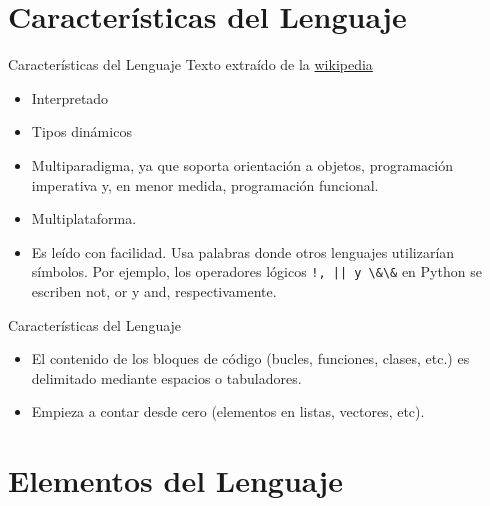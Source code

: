 \documentclass[hyperref={colorlinks=true}]{beamer}
\begin{document}
\section{Características del Lenguaje}
\begin{frame}{Características del Lenguaje}
\onslide<+->Texto extraído de la \href{http://es.wikipedia.org/wiki/Python\#Elementos_del_lenguaje}{wikipedia}
\begin{itemize}
\item<+-> Interpretado
\item<+-> Tipos dinámicos
\item<+->  Multiparadigma, ya que soporta orientación a objetos, programación imperativa y, en menor medida, programación funcional.
\item<+-> Multiplataforma.

\item<+-> Es leído con facilidad. Usa  palabras donde otros lenguajes utilizarían símbolos. Por ejemplo, los operadores lógicos \verb~!, || y \&\&~ en Python se escriben not, or y and, respectivamente.

\end{itemize}

\end{frame}




\begin{frame}{Características del Lenguaje}

\begin{itemize}

\item<+->  El contenido de los bloques de código (bucles, funciones, clases, etc.) es delimitado mediante espacios o tabuladores.

\item<+-> Empieza a contar desde cero (elementos en listas, vectores, etc).



\end{itemize}
\end{frame}



\section{Elementos del Lenguaje}

\end{document}
